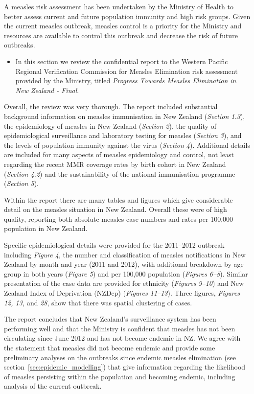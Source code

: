 \documentclass{article}
\begin{document}
\begin{itemize}
A measles risk assessment has been undertaken by the Ministry of Health to better assess current and future population immunity and high risk groups. Given the current measles outbreak, measles control is a priority for the Ministry and resources are available to control this outbreak and decrease the risk of future outbreaks.
\begin{itemize}
\item In this section we review the confidential report to the Western Pacific Regional Verification Commission for Measles Elimination risk assessment provided by the Ministry, titled \emph {Progress Towards Measles Elimination in New Zealand - Final}.
\end{itemize}

Overall, the review was very thorough. The report included substantial background information on measles immunisation in New Zealand (\emph{Section 1.3}), the epidemiology of measles in New Zealand (\emph{Section 2}), the quality of epidemiological surveillance and laboratory testing for measles (\emph{Section 3}), and the levels of population immunity against the virus (\emph{Section 4}). Additional details are included for many aspects of measles epidemiology and control, not least regarding the recent MMR coverage rates by birth cohort in New Zealand (\emph{Section 4.2}) and the sustainability of the national immunisation programme (\emph{Section 5}).

Within the report there are many tables and figures which give considerable detail on the measles situation in New Zealand. Overall these were of high quality, reporting both absolute measles case numbers and rates per 100,000 population in New Zealand.

Specific epidemiological details were provided for the 2011--2012 outbreak including \emph{Figure 4}, the number and classification of measles notifications in New Zealand by month and year (2011 and 2012), with additional breakdown by age group in both years (\emph{Figure 5}) and per 100,000 population (\emph{Figures 6--8}). Similar presentation of the case data are provided for ethnicity (\emph{Figures 9--10}) and New Zealand Index of Deprivation (NZDep) (\emph{Figures 11--13}). Three figures, \emph{Figures 12, 13,} and \emph{28}, show that there was spatial clustering of cases.

The report concludes that New Zealand's surveillance system has been performing well and that the Ministry is confident that measles has not been circulating since June 2012 and has not become endemic in NZ. We agree with the statement that measles did not become endemic and provide some preliminary analyses on the outbreaks since endemic measles elimination (see section~\ref{sec:epidemic_modelling}) that give information regarding the likelihood of measles persisting within the population and becoming endemic, including analysis of the current outbreak.


\end{itemize}
\end{document}
